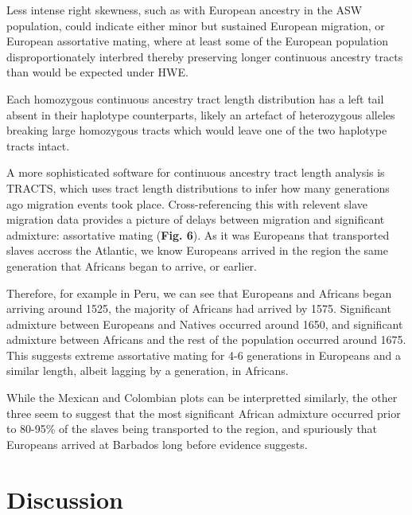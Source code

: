 \documentclass[11pt]{article}
\begin{document}
Less intense right skewness, such as with European ancestry in the ASW population, could indicate either minor but sustained European migration, or European assortative mating, where at least some of the European population disproportionately interbred thereby preserving longer continuous ancestry tracts than would be expected under HWE.

Each homozygous continuous ancestry tract length distribution has a left tail absent in their haplotype counterparts, likely an artefact of heterozygous alleles breaking large homozygous tracts which would leave one of the two haplotype tracts intact.

A more sophisticated software for continuous ancestry tract length analysis is TRACTS, which uses tract length distributions to infer how many generations ago migration events took place. Cross-referencing this with relevent slave migration data provides a picture of delays between migration and significant admixture: assortative mating (\textbf{Fig. 6}). As it was Europeans that transported slaves accross the Atlantic, we know Europeans arrived in the region the same generation that Africans began to arrive, or earlier.

Therefore, for example in Peru, we can see that Europeans and Africans began arriving around 1525, the majority of Africans had arrived by 1575. Significant admixture between Europeans and Natives occurred around 1650, and significant admixture between Africans and the rest of the population occurred around 1675. This suggests extreme assortative mating for 4-6 generations in Europeans and a similar length, albeit lagging by a generation, in Africans.

While the Mexican and Colombian plots can be interpretted similarly, the other three seem to suggest that the most significant African admixture occurred prior to 80-95\% of the slaves being transported to the region, and spuriously that Europeans arrived at Barbados long before evidence suggests. 








\vspace{8mm}
\section{Discussion}
\end{document}
